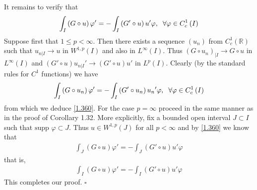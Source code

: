 \documentclass[a4paper,oneside]{book}
\numberwithin{equation}{chapter}
\begin{document}
It remains to verify that
\begin{align}
\label{1.360}
\int_I {\left( {G \circ u} \right)\varphi '}  =  - \int_I {\left( {G' \circ u} \right)u'\varphi } ,\hspace{0.2cm}\forall \varphi  \in C_c^1\left( I \right)
\end{align}
Suppose first that $1\le p<\infty$. Then there exists a sequence $\left(u_n\right)$ from $C_c^1\left(\mathbb{R}\right)$ such that ${u_{\left. n \right|I}} \to u$ in $W^{1,p}\left(I\right)$ and also in $L^{\infty}\left(I\right)$. Thus ${\left( {G \circ {u_n}} \right)_{|I}} \to G \circ u$ in $L^{\infty}\left(I\right)$ and $\left( {G' \circ u} \right){u_{\left. n \right|I}}' \to \left( {G' \circ u} \right)u'$ in $L^p\left(I\right)$. Clearly (by the standard rules for $C^1$ functions) we have
\begin{align}
\int_I {\left( {G \circ {u_n}} \right)\varphi '}  =  - \int_I {\left( {G' \circ {u_n}} \right){u_n}'\varphi } ,\hspace{0.2cm} \forall \varphi  \in C_c^1\left( I \right)
\end{align}
from which we deduce \eqref{1.360}. For the case $p=\infty$ proceed in the same manner as in the proof of Corollary 1.32. More explicitly, fix a bounded open interval $J\subset I$ such that $\mbox{supp }\varphi \subset J$. Thus $u\in W^{1,p}\left(J\right)$ for all $p<\infty$ and by \eqref{1.360} we know that
\begin{align}
\int_J {\left( {G \circ u} \right)\varphi '}  =  - \int_J {\left( {G' \circ u} \right)u'\varphi } 
\end{align}
that is,
\begin{align}
\int_I {\left( {G \circ u} \right)\varphi '}  =  - \int_I {\left( {G' \circ u} \right)u'\varphi } 
\end{align}
This completes our proof. \hfill $\square$
\end{document}
